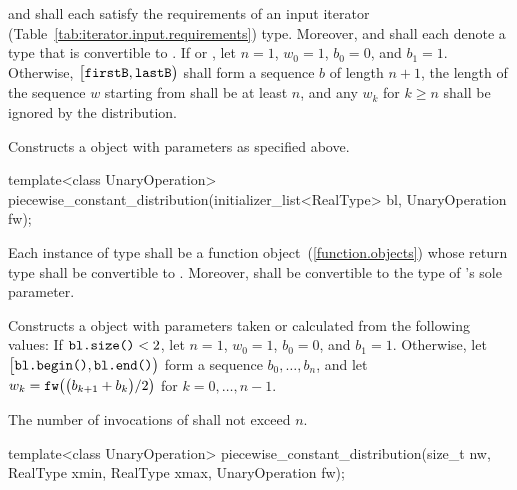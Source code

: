 \begin{itemdescr}
\pnum\requires
   and 
  shall each satisfy the requirements
  of an input iterator (Table~\ref{tab:iterator.input.requirements}) type.
  Moreover,
   and
  shall each denote a type that is convertible to .
 If 
 or ,
 let $ n = 1 $,
     $ w_0 = 1 $,
     $ b_0 = 0 $,
 and $ b_1 = 1 $.
 Otherwise,
 $\bigl[\texttt{firstB}, \texttt{lastB}\bigr)$
 shall form a sequence $b$ of length $n+1$,
 the length of the sequence $w$ starting from 
 shall be at least $n$,
 and any $w_k$ for  $k \geq n$ shall be ignored by the distribution.

\pnum\effects Constructs a  object
 with parameters as specified above.
\end{itemdescr}


%
\begin{itemdecl}
template<class UnaryOperation>
 piecewise_constant_distribution(initializer_list<RealType> bl, UnaryOperation fw);
\end{itemdecl}

\begin{itemdescr}
\pnum\requires
 Each instance of type 
 shall be a function object~(\ref{function.objects})
 whose return type shall be convertible to .
 Moreover,
  shall be convertible
 to the type of 's sole parameter.

\pnum\effects Constructs a  object
 with parameters taken or calculated
 from the following values:
 If $\texttt{bl.size()} < 2$,
 let $n = 1$,
     $ w_0 = 1 $,
     $ b_0 = 0 $,
 and $ b_1 = 1 $.
 Otherwise,
 let $\bigl[\texttt{bl.begin()}, \texttt{bl.end()}\bigr)$
 form a sequence $ b_0, \ldots, b_n $,
 and
 let $ w_k = \texttt{fw}\bigl(\bigl(b_{k+1} + b_k\bigr) / 2\bigr) $
 for $ k = 0, \ldots, n\!-\!1 $.

\pnum\complexity
 The number of invocations of  shall not exceed $n$.
\end{itemdescr}


%
\begin{itemdecl}
template<class UnaryOperation>
 piecewise_constant_distribution(size_t nw, RealType xmin, RealType xmax, UnaryOperation fw);
\end{itemdecl}

